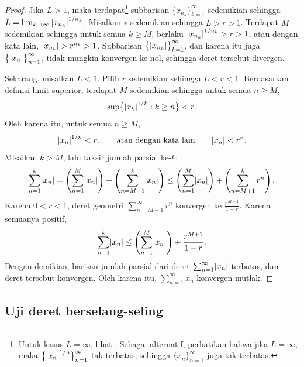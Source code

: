 \begin{proof}
Jika $L > 1$, maka terdapat\footnote{%
Untuk kasus $L=\infty$, lihat .
Sebagai alternatif, perhatikan bahwa jika $L=\infty$, maka $\bigl\{ {\lvert {x_{n}} \rvert}^{1/n}
\bigr\}_{n=1}^\infty$
tak terbatas, sehingga
$\{ x_n \}_{n=1}^\infty$ juga tak terbatas.}
subbarisan $\{ x_{n_k} \}_{k=1}^\infty$ sedemikian sehingga
$L = \lim_{k\to\infty} {\lvert {x_{n_k}} \rvert}^{1/n_k}$.  Misalkan
$r$ sedemikian sehingga $L > r > 1$.  Terdapat $M$ sedemikian
sehingga untuk semua $k \geq M$, berlaku 
${\lvert {x_{n_k}} \rvert}^{1/n_k} > r > 1$, atau dengan kata lain,
$\lvert {x_{n_k}} \rvert > r^{n_k} > 1$.
Subbarisan 
$\bigl\{ \lvert {x_{n_k}} \rvert \bigr\}_{k=1}^\infty$,
dan karena itu juga
$\bigl\{ \lvert {x_{n}} \rvert \bigr\}_{n=1}^\infty$,
tidak mungkin konvergen ke nol, sehingga deret tersebut divergen.

Sekarang, misalkan $L < 1$.  Pilih $r$ sedemikian sehingga $L < r < 1$.
Berdasarkan definisi limit superior,
terdapat $M$ sedemikian sehingga untuk semua $n \geq M$,
\begin{equation*}
\sup \bigl\{ {\lvert {x_k} \rvert}^{1/k} : k \geq n \bigr\} < r .
\end{equation*}
Oleh karena itu, untuk semua $n \geq M$,
\begin{equation*}
{\lvert {x_n} \rvert}^{1/n} < r , \qquad \text{atau dengan kata lain} \qquad \lvert {x_n} \rvert < r^n .
\end{equation*}
Misalkan $k > M$, lalu taksir jumlah parsial ke-$k$:
\begin{equation*}
\sum_{n=1}^k \lvert {x_n} \rvert = 
\left( \sum_{n=1}^M \lvert {x_n} \rvert \right) + 
\left( \sum_{n=M+1}^k \lvert {x_n} \rvert \right)
\leq
\left( \sum_{n=1}^M \lvert {x_n} \rvert \right) + 
\left( \sum_{n=M+1}^k r^n \right) .
\end{equation*}
Karena $0 < r < 1$,
deret geometri $\sum_{n=M+1}^\infty r^n$ konvergen ke
$\frac{r^{M+1}}{1-r}$.  Karena semuanya positif,
\begin{equation*}
\sum_{n=1}^k \lvert {x_n} \rvert 
\leq
\left( \sum_{n=1}^M \lvert {x_n} \rvert \right) + 
\frac{r^{M+1}}{1-r} .
\end{equation*}
Dengan demikian, barisan jumlah parsial dari deret $\sum_{n=1}^\infty \lvert {x_n} \rvert$ terbatas, dan
deret tersebut konvergen.  Oleh karena itu, $\sum_{n=1}^\infty x_n$ konvergen mutlak.
\end{proof}

\subsection{Uji deret berselang-seling}

